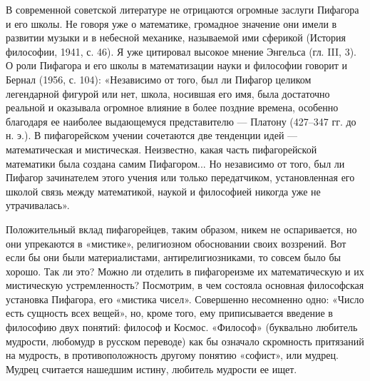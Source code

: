 В  современной советской  литературе  не  отрицаются огромные  заслуги
Пифагора и его  школы. Не говоря уже о  математике, громадное значение
они  имели в  развитии музыки  и в  небесной механике,  называемой ими
сферикой (История  философии, 1941,  с. 46).  Я уже  цитировал высокое
мнение  Энгельса  (гл.  III,  3).  О  роли  Пифагора  и  его  школы  в
математизации  науки и  философии  говорит и  Бернал  (1956, с.  104):
«Независимо от  того, был ли  Пифагор целиком легендарной  фигурой или
нет, школа,  носившая его  имя, была  достаточно реальной  и оказывала
огромное  влияние  в  более  поздние времена,  особенно  благодаря  ее
наиболее  выдающемуся  представителю  ---  Платону  (427--347  гг.  до
н.  э.). В  пифагорейском  учении сочетаются  две  тенденции идей  ---
математическая  и мистическая.  Неизвестно, какая  часть пифагорейской
математики  была создана  самим  Пифагором... Но  независимо от  того,
был  ли  Пифагор зачинателем  этого  учения  или только  передатчиком,
установленная его школой связь  между математикой, наукой и философией
никогда уже не утрачивалась».

Положительный   вклад   пифагорейцев,    таким   образом,   никем   не
оспаривается,   но    они   упрекаются   в    «мистике»,   религиозном
обосновании  своих воззрений.  Вот  если бы  они были  материалистами,
антирелигиозниками,  то  совсем было  бы  хорошо.  Так ли  это?  Можно
ли  отделить  в  пифагореизме   их  математическую  и  их  мистическую
устремленность?  Посмотрим,   в  чем  состояла   основная  философская
установка Пифагора,  его «мистика чисел». Совершенно  несомненно одно:
«Число есть  сущность всех вещей»,  но, кроме того,  ему приписывается
введение  в  философию  двух  понятий:  философ  и  Космос.  «Философ»
(буквально  любитель мудрости,  любомудр  в русском  переводе) как  бы
означало  скромность  притязаний   на  мудрость,  в  противоположность
другому  понятию  «софист»,  или  мудрец.  Мудрец  считается  нашедшим
истину, любитель мудрости ее ищет.


